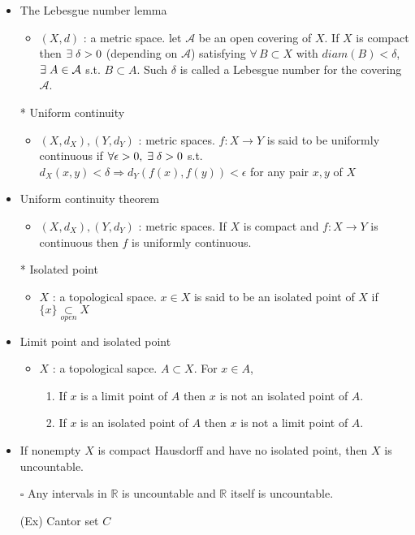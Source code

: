 \documentclass[12pt]{article}
\newcommand{\sq}{$\square$}
\newcommand{\spone}{\hspace{0.1cm}}
\newcommand{\Real}{\mathbb{R}}
\newcommand{\A}{\mathcal{A}}
\newcommand{\open}{\underset{open}{\subset}}
\newcommand{\exist}{\exists\spone}
\begin{document}
\begin{itemize}
	\item The Lebesgue number lemma
	\begin{itemize}
		\item $(X,d)$ : a metric space. let $\A$ be an open covering of $X$. If $X$ is compact then $\exist \delta>0$ (depending on $\A$) satisfying $\forall \, B\subset X$ with $diam(B)<\delta$, $\exist A\in \A$ s.t. $B\subset A$. Such $\delta$ is called a Lebesgue number for the covering $\A$.
	\end{itemize}
	\item[*] Uniform continuity
	\begin{itemize}
		\item $(X, d_X), (Y, d_Y)$ : metric spaces. $f:X\rightarrow Y$ is said to be uniformly continuous if $\forall \epsilon >0, \; \exist \delta>0$ s.t. $d_X(x,y)<\delta \Rightarrow d_Y(f(x), f(y))<\epsilon$ \;for any pair $x,y$ of $X$
	\end{itemize}
	\item Uniform continuity theorem
	\begin{itemize}
		\item $(X, d_X), (Y, d_Y)$ : metric spaces. If $X$ is compact and $f: X\rightarrow Y$ is continuous then $f$ is uniformly continuous.
	\end{itemize}
	\item[*] Isolated point
	\begin{itemize}
		\item $X$ : a topological space. $x\in X$ is said to be an isolated point of $X$ if $\{x\}\open X$
	\end{itemize}
\clearpage
	\item Limit point and isolated point
	\begin{itemize}
		\item $X$ : a topological sapce. $A\subset X$. For $x\in A$, \begin{enumerate}
			\item If $x$ is a limit point of $A$ then $x$ is not an isolated point of $A$.
			\item If $x$ is an isolated point of $A$ then $x$ is not a limit point of $A$.
		\end{enumerate}
	\end{itemize}
	\item If nonempty $X$ is compact Hausdorff and have no isolated point, then $X$ is uncountable.
	\item[\sq]Any intervals in $\Real$ is uncountable and $\Real$ itself is uncountable.
	\item[(Ex)] Cantor set $C$

\end{itemize}
\end{document}
